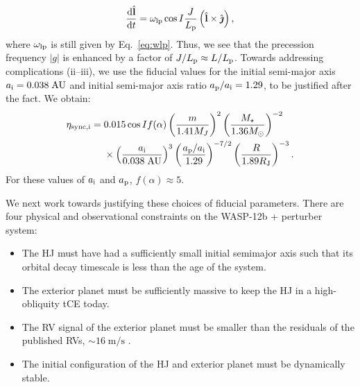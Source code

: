 \documentclass[
        fleqn,
        usenatbib,
    ]{mnras}
\newcommand*{\rd}[2]{\frac{\mathrm{d}#1}{\mathrm{d}#2}}
\newcommand*{\abs}[1]{\left|#1\right|}
\newcommand*{\p}[1]{\left(#1\right)}
\newcommand*{\uv}[1]{\hat{\boldsymbol{\mathbf{#1}}}}
\begin{document}
\begin{equation}
    \rd{\uv{l}}{t} = \omega_{\rm lp}\cos I \frac{J}{L_{\rm p}}
        \p{\uv{l} \times \uv{\jmath}},
        \label{eq:wasp12b_g}
\end{equation}
where $\omega_{\rm lp}$ is still given by Eq.~\eqref{eq:wlp}. Thus, we see that
the precession frequency $\abs{g}$ is enhanced by a factor of $J / L_{\rm p}
\approx L / L_{\rm p}$. Towards addressing complications (ii--iii),%
we use the fiducial values for the initial semi-major axis $a_{\rm i} =
0.038\;\mathrm{AU}$ and initial semi-major axis ratio $a_{\rm p} / a_{\rm i} =
1.29$, to be justified after the fact. We obtain:
\begin{align}
    \eta_{\rm sync, i} ={}& 0.015 \cos I f(\alpha)
            \p{\frac{m}{1.41M_J}}^2
            \p{\frac{M_\star}{1.36M_{\odot}}}^{-2}
            \nonumber\\
        &\times
            \p{\frac{a_{\rm i}}{0.038\;\mathrm{AU}}}^{3}
            \p{\frac{a_{\rm p} / a_{\rm i}}{1.29}}^{-7/2}
            \p{\frac{R}{1.89R_{\rm J}}}^{-3}.\label{eq:hj_etasync}
\end{align}
For these values of $a_{\rm i}$ and $a_{\rm p}$, $f(\alpha) \approx 5$.

We next work towards justifying these choices of fiducial parameters. There are
four physical and observational constraints on the WASP-12b + perturber system:
\begin{itemize}
    \item The HJ must have had a sufficiently small initial semimajor axis such
        that its orbital decay timescale is less than the age of the system.

    \item The exterior planet must be sufficiently massive to keep the HJ in a
        high-obliquity tCE today.

    \item The RV signal of the exterior planet must be smaller than the
        residuals of the published RVs, $\sim 16\;\mathrm{m/s}$
        \citep{hebb2009wasp, husnoo2011orbital, knutson2014friends,
        bonomo2017gaps}.

    \item The initial configuration of the HJ and exterior planet must be
        dynamically stable.
\end{itemize}
\end{document}
